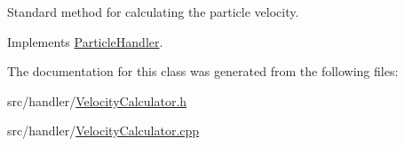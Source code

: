 Standard method for calculating the particle velocity. 



Implements \hyperlink{classParticleHandler_a95783831b8077d447c95ec5e2627c1fa}{Particle\-Handler}.



The documentation for this class was generated from the following files\-:\begin{DoxyCompactItemize}
\item 
src/handler/\hyperlink{VelocityCalculator_8h}{Velocity\-Calculator.\-h}\item 
src/handler/\hyperlink{VelocityCalculator_8cpp}{Velocity\-Calculator.\-cpp}\end{DoxyCompactItemize}
